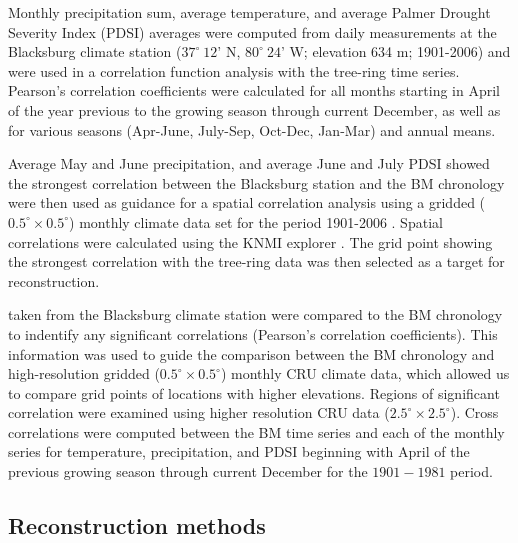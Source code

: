 Monthly precipitation sum, average temperature, and average Palmer
Drought Severity Index (PDSI) \cite{palmer1965meteorological} averages
were computed from daily measurements at the Blacksburg climate station
($37^{\circ} \ 12$' N, $80^{\circ}\ 24$' W; elevation 634 m; 1901-2006)
and were used in a correlation function analysis with the tree-ring time
series. Pearson's correlation coefficients were calculated for all months
starting in April of the year previous to the growing season through
current December, as well as for various seasons (Apr-June, July-Sep,
Oct-Dec, Jan-Mar) and annual means.

Average May and June precipitation, and average June and July PDSI
showed the strongest correlation between the Blacksburg station
and the BM chronology were then used as guidance for a spatial
correlation analysis using a gridded ($0.5^{\circ} \times 0.5^{\circ}$)
monthly climate data set for the period 1901-2006 \cite[CRUTS3.10;
][]{harris2013updated}. Spatial correlations were calculated using the
KNMI explorer \cite[; http://climexp.knmi.nl]{trouet2013knmi}. The grid
point showing the strongest correlation with the tree-ring data was then
selected as a target for reconstruction.

taken from the Blacksburg climate station  were compared to the
BM chronology to indentify any significant correlations (Pearson's
correlation coefficients). This information was used to guide the
comparison between the BM chronology and high-resolution gridded
($0.5^{\circ} \times 0.5^{\circ}$) monthly CRU climate data, which allowed
us to compare grid points of locations with higher elevations. Regions of
significant correlation were examined using higher resolution CRU data
($2.5^{\circ} \times 2.5^{\circ}$). Cross correlations were computed
between the BM time series and each of the monthly series for temperature,
precipitation, and PDSI beginning with April of the previous growing
season through current December for the $1901 - 1981$ period.

\subsection{Reconstruction methods}

